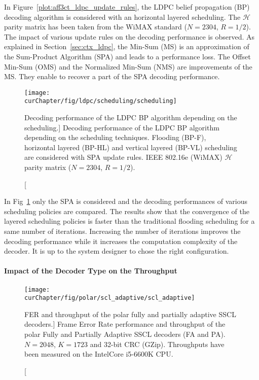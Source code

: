 In Figure~\ref{plot:aff3ct_ldpc_update_rules}, the LDPC belief propagation (BP)
decoding algorithm is considered with an horizontal layered scheduling. The
$\mathcal{H}$ parity matrix has been taken from the WiMAX standard ($N=2304$,
$R=1/2$). The impact of various update rules on the decoding performance is
observed. As explained in Section~\ref{sec:ctx_ldpc}, the Min-Sum (MS) is an
approximation of the Sum-Product Algorithm (SPA) and leads to a performance
loss. The Offset Min-Sum (OMS) and the Normalized Min-Sum (NMS) are improvements
of the MS. They enable to recover a part of the SPA decoding performance.

\begin{figure}[htp]
  \centering
  \texttt{[image: \\curChapter/fig/ldpc/scheduling/scheduling]}
  \caption
    [Decoding performance of the LDPC BP algorithm depending on the scheduling.]
    {Decoding performance of the LDPC BP algorithm depending on the scheduling
     techniques. Flooding (BP-F), horizontal layered (BP-HL) and vertical
     layered (BP-VL) scheduling are considered with SPA update rules. IEEE
     802.16e (WiMAX) $\mathcal{H}$ parity matrix ($N=2304$, $R=1/2$).}
  \label{plot:aff3ct_ldpc_scheduling}
\end{figure}

In Fig~\ref{plot:aff3ct_ldpc_scheduling} only the SPA is considered
and the decoding performances of various scheduling policies are compared. The
results show that the convergence of the layered scheduling policies is faster
than the traditional flooding scheduling for a same number of iterations.
Increasing the number of iterations improves the decoding performance while it
increases the computation complexity of the decoder. It is up to the system
designer to chose the right configuration.

\paragraph{Impact of the Decoder Type on the Throughput}

\begin{figure}[htp]
  \centering
  \texttt{[image: \\curChapter/fig/polar/scl\_adaptive/scl\_adaptive]}
  \caption
    [FER and throughput of the polar fully and partially adaptive SSCL
     decoders.]
    {Frame Error Rate performance and throughput of the polar Fully and
     Partially Adaptive SSCL decoders (FA and PA). $N = 2048$, $K = 1723$ and
     32-bit CRC (GZip). Throughputs have been measured on the Intel\R Core\TM
     i5-6600K CPU.}
  \label{plot:aff3ct_polar_scl_adaptive}
\end{figure}

